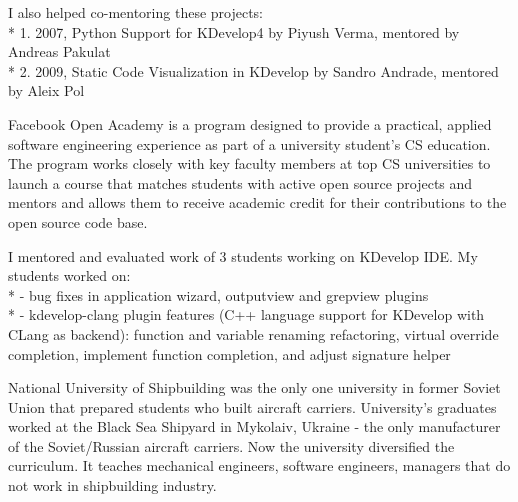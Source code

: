 \documentclass[12pt]{letter}
\begin{document}
\begin{llist}
            \item I also helped co-mentoring these projects:\\*
                  1. 2007, Python Support for KDevelop4 by Piyush Verma, mentored by Andreas Pakulat\\*
                  2. 2009, Static Code Visualization in KDevelop by Sandro Andrade, mentored by Aleix Pol

  \endexperience

  \location{}

  \startexperience

           \item Facebook Open Academy is a program designed to provide a practical, applied software engineering experience as part of a university student’s CS education. The program works closely with key faculty members at top CS universities to launch a course that matches students with active open source projects and mentors and allows them to receive academic credit for their contributions to the open source code base.

           \item I mentored and evaluated work of 3 students working on KDevelop IDE. My students worked on:\\*
                  - bug fixes in application wizard, outputview and grepview plugins\\*
                  - kdevelop-clang plugin features (C++ language support for KDevelop with CLang as backend): function and variable renaming refactoring, virtual override completion, implement function completion, and adjust signature helper

  \endexperience






  \startexperience

            \item National University of Shipbuilding was the only one university in former Soviet Union that prepared students who built aircraft carriers. University's graduates worked at the Black Sea Shipyard in Mykolaiv, Ukraine - the only manufacturer of the Soviet/Russian aircraft carriers. Now the university diversified the curriculum. It teaches mechanical engineers, software engineers, managers that do not work in shipbuilding industry.


\end{llist}
\end{document}
